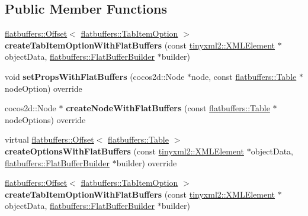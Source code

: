 \subsection*{Public Member Functions}
\begin{DoxyCompactItemize}
\item 
\mbox{\label{classTabItemReader_a7231c27e25e72b1a719d42d661da20d5}} 
\hyperlink{structflatbuffers_1_1Offset}{flatbuffers\+::\+Offset}$<$ \hyperlink{structflatbuffers_1_1TabItemOption}{flatbuffers\+::\+Tab\+Item\+Option} $>$ {\bfseries create\+Tab\+Item\+Option\+With\+Flat\+Buffers} (const \hyperlink{classtinyxml2_1_1XMLElement}{tinyxml2\+::\+X\+M\+L\+Element} $\ast$object\+Data, \hyperlink{classflatbuffers_1_1FlatBufferBuilder}{flatbuffers\+::\+Flat\+Buffer\+Builder} $\ast$builder)
\item 
\mbox{\label{classTabItemReader_a65289228e39c06dbf06d73ef431bef6e}} 
void {\bfseries set\+Props\+With\+Flat\+Buffers} (cocos2d\+::\+Node $\ast$node, const \hyperlink{classflatbuffers_1_1Table}{flatbuffers\+::\+Table} $\ast$node\+Option) override
\item 
\mbox{\label{classTabItemReader_ab80f2b66b83b7f8a96f46f0dce223b42}} 
cocos2d\+::\+Node $\ast$ {\bfseries create\+Node\+With\+Flat\+Buffers} (const \hyperlink{classflatbuffers_1_1Table}{flatbuffers\+::\+Table} $\ast$node\+Options) override
\item 
\mbox{\label{classTabItemReader_a44a18b065649bcba163a70ed529a9c09}} 
virtual \hyperlink{structflatbuffers_1_1Offset}{flatbuffers\+::\+Offset}$<$ \hyperlink{classflatbuffers_1_1Table}{flatbuffers\+::\+Table} $>$ {\bfseries create\+Options\+With\+Flat\+Buffers} (const \hyperlink{classtinyxml2_1_1XMLElement}{tinyxml2\+::\+X\+M\+L\+Element} $\ast$object\+Data, \hyperlink{classflatbuffers_1_1FlatBufferBuilder}{flatbuffers\+::\+Flat\+Buffer\+Builder} $\ast$builder) override
\item 
\mbox{\label{classTabItemReader_a21e863730835dd63e06c843e58ce0bc4}} 
\hyperlink{structflatbuffers_1_1Offset}{flatbuffers\+::\+Offset}$<$ \hyperlink{structflatbuffers_1_1TabItemOption}{flatbuffers\+::\+Tab\+Item\+Option} $>$ {\bfseries create\+Tab\+Item\+Option\+With\+Flat\+Buffers} (const \hyperlink{classtinyxml2_1_1XMLElement}{tinyxml2\+::\+X\+M\+L\+Element} $\ast$object\+Data, \hyperlink{classflatbuffers_1_1FlatBufferBuilder}{flatbuffers\+::\+Flat\+Buffer\+Builder} $\ast$builder)

\end{DoxyCompactItemize}

